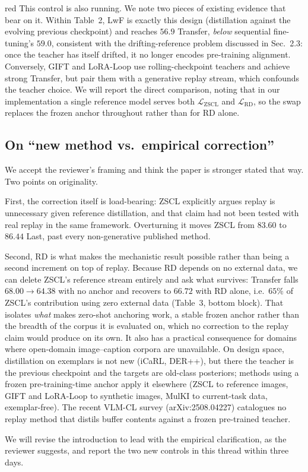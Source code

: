 \documentclass[11pt]{article}
\begin{document}
\begin{color}{red}
This control is also running. We note two pieces of existing evidence that bear on it. Within Table~2, LwF is exactly this design (distillation against the evolving previous checkpoint) and reaches $56.9$ Transfer, \emph{below} sequential fine-tuning's $59.0$, consistent with the drifting-reference problem discussed in Sec.~2.3: once the teacher has itself drifted, it no longer encodes pre-training alignment. Conversely, GIFT and LoRA-Loop use rolling-checkpoint teachers and achieve strong Transfer, but pair them with a generative replay stream, which confounds the teacher choice. We will report the direct comparison, noting that in our implementation a single reference model serves both $\mathcal{L}_\text{ZSCL}$ and $\mathcal{L}_\text{RD}$, so the swap replaces the frozen anchor throughout rather than for RD alone.

\subsection*{On ``new method vs.\ empirical correction''}

We accept the reviewer's framing and think the paper is stronger stated that way. Two points on originality.

First, the correction itself is load-bearing: ZSCL explicitly argues replay is unnecessary given reference distillation, and that claim had not been tested with real replay in the same framework. Overturning it moves ZSCL from $83.60$ to $86.44$ Last, past every non-generative published method.

Second, RD is what makes the mechanistic result possible rather than being a second increment on top of replay. Because RD depends on no external data, we can delete ZSCL's reference stream entirely and ask what survives: Transfer falls $68.00 \to 64.38$ with no anchor and recovers to $66.72$ with RD alone, i.e.\ $65\%$ of ZSCL's contribution using zero external data (Table~3, bottom block). That isolates \emph{what} makes zero-shot anchoring work, a stable frozen anchor rather than the breadth of the corpus it is evaluated on, which no correction to the replay claim would produce on its own. It also has a practical consequence for domains where open-domain image--caption corpora are unavailable. On design space, distillation on exemplars is not new (iCaRL, DER++), but there the teacher is the previous checkpoint and the targets are old-class posteriors; methods using a frozen pre-training-time anchor apply it elsewhere (ZSCL to reference images, GIFT and LoRA-Loop to synthetic images, MulKI to current-task data, exemplar-free). The recent VLM-CL survey (arXiv:2508.04227) catalogues no replay method that distils buffer contents against a frozen pre-trained teacher.

We will revise the introduction to lead with the empirical clarification, as the reviewer suggests, and report the two new controls in this thread within three days.
\end{color}
\end{document}

